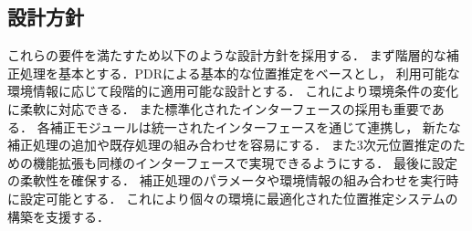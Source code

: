 \subsection{設計方針}
これらの要件を満たすため以下のような設計方針を採用する．
まず階層的な補正処理を基本とする．PDRによる基本的な位置推定をベースとし，
利用可能な環境情報に応じて段階的に適用可能な設計とする．
これにより環境条件の変化に柔軟に対応できる．
また標準化されたインターフェースの採用も重要である．
各補正モジュールは統一されたインターフェースを通じて連携し，
新たな補正処理の追加や既存処理の組み合わせを容易にする．
また3次元位置推定のための機能拡張も同様のインターフェースで実現できるようにする．
最後に設定の柔軟性を確保する．
補正処理のパラメータや環境情報の組み合わせを実行時に設定可能とする．
これにより個々の環境に最適化された位置推定システムの構築を支援する．

